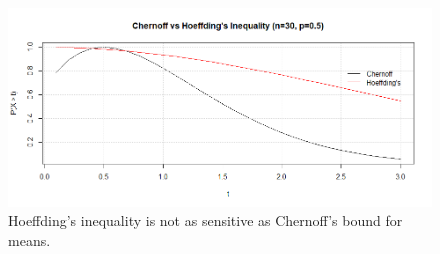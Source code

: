 \begin{figure}[H]
        \centering
        \includegraphics[scale=0.6]{Chernoff_Vs_Hoeffding}
        \caption{Hoeffding's inequality is not as sensitive as Chernoff's bound for means. }
\end{figure}